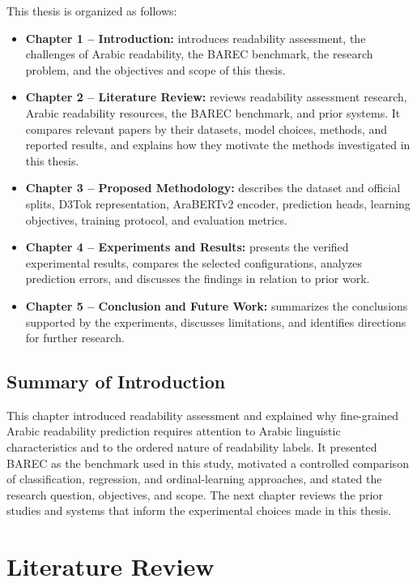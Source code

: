 \documentclass[12pt]{report}
\begin{document}
This thesis is organized as follows:

\begin{itemize}
    \item \textbf{Chapter 1 -- Introduction:} introduces readability assessment, the challenges of Arabic readability, the BAREC benchmark, the research problem, and the objectives and scope of this thesis.
    \item \textbf{Chapter 2 -- Literature Review:} reviews readability assessment research, Arabic readability resources, the BAREC benchmark, and prior systems. It compares relevant papers by their datasets, model choices, methods, and reported results, and explains how they motivate the methods investigated in this thesis.
    \item \textbf{Chapter 3 -- Proposed Methodology:} describes the dataset and official splits, D3Tok representation, AraBERTv2 encoder, prediction heads, learning objectives, training protocol, and evaluation metrics.
    \item \textbf{Chapter 4 -- Experiments and Results:} presents the verified experimental results, compares the selected configurations, analyzes prediction errors, and discusses the findings in relation to prior work.
    \item \textbf{Chapter 5 -- Conclusion and Future Work:} summarizes the conclusions supported by the experiments, discusses limitations, and identifies directions for further research.
\end{itemize}

\section{Summary of Introduction}

This chapter introduced readability assessment and explained why fine-grained Arabic readability prediction requires attention to Arabic linguistic characteristics and to the ordered nature of readability labels. It presented BAREC as the benchmark used in this study, motivated a controlled comparison of classification, regression, and ordinal-learning approaches, and stated the research question, objectives, and scope. The next chapter reviews the prior studies and systems that inform the experimental choices made in this thesis.

\chapter{Literature Review}
\label{chap:relatedwork}
\end{document}
